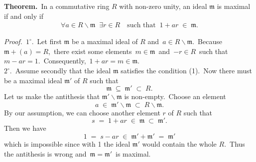 \documentclass[12pt]{article}
\theoremstyle{definition}
\begin{document}

\textbf{Theorem.}\, In a commutative ring $R$ with non-zero unity, an ideal $\mathfrak{m}$ 
is maximal if and only if
\begin{align}
\forall a \in R\!\smallsetminus\!\mathfrak{m} \;\; \exists r \in R \quad\mbox{such that}\;\; 
1\!+\!ar \;\in\; \mathfrak{m}.
\end{align}



\emph{Proof.}\, $1^\circ$.\, Let first $\mathfrak{m}$ be a maximal ideal of $R$ and\, 
$a \in R\!\smallsetminus\!\mathfrak{m}$.\, Because\, $\mathfrak{m}\!+\!(a) = R$,\, there exist some elements\, 
$m \in \mathfrak{m}$\, and\, $-r \in R$\, such that\, $m\!-\!ar = 1$.\, Consequently,\, $1\!+\!ar = m \in \mathfrak{m}$.\\
$2^\circ$.\, Assume secondly that the ideal $\mathfrak{m}$ satisfies the condition (1).\, Now there must be a maximal ideal $\mathfrak{m}'$ of $R$ such that
$$\mathfrak{m} \;\subseteq\; \mathfrak{m}' \;\subset\; R.$$
Let us make the antithesis that $\mathfrak{m}'\!\smallsetminus\!\mathfrak{m}$ is non-empty.\, Choose an element
$$a \;\in\; \mathfrak{m}'\!\smallsetminus\!\mathfrak{m} \;\subset\; R\!\smallsetminus\!\mathfrak{m}.$$
By our assumption, we can choose another element $r$ of $R$ such that
$$s \;=\; 1\!+\!ar \;\in\; \mathfrak{m} \;\subset\; \mathfrak{m}'.$$
Then we have
$$1 \;=\; s\!-\!ar \;\in\; \mathfrak{m}'\!+\!\mathfrak{m}' \;=\; \mathfrak{m}'$$
which is impossible since with 1 the ideal $\mathfrak{m}'$ would contain the whole $R$.\, Thus the antithesis is wrong and\, $\mathfrak{m} = \mathfrak{m}'$\, is maximal.

\end{document}
